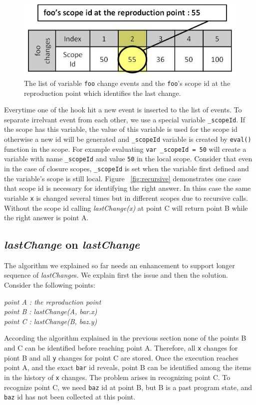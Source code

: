 \documentclass[preprint]{sigplanconf}
\begin{document}
\begin{figure}[htp]
\includegraphics[width=.48\textwidth]{7-foo-changes2.jpg}
\caption{The list of variable \texttt{foo} change events and the \texttt{foo}'s scope id at the reproduction point which identifies the last change.}
\label{fig:foo-changes2}
\end{figure}

Everytime one of the hook hit a new event is inserted to the list of events. To separate irrelvant event from each other, we use a special variable \texttt{\_scopeId}. If the scope has this variable, the value of this variable is used for the scope id otherwise a new id will be generated and \texttt{\_scopeId} variable is created by \texttt{eval()} function in the scope. For example evaluating \texttt{var \_scopeId = 50} will create a variable with name \texttt{\_scopeId} and value \texttt{50} in the local scope. Consider that even in the case of closure scopes, \texttt{\_scopeId} is set when the variable first defined and the variable's scope is still local. Figure ~\ref{fig:recursive} demonstrates one case that scope id is necessary for identifying the right answer. In thiss case the same variable \texttt{x} is changed several times but in different scopes due to recursive calls. Without the scope id calling \textit{lastChange(x)} at point C will return point B while the right answer is point A.
 
\subsection{\textit{lastChange} on \textit{lastChange}}
The algorithm we explained so far needs an enhancement to support longer sequence of \textit{lastChange}s. We explain first the issue and then the solution. Consider the following points:

\begin{center}
\textit{
 point A : the reproduction point \\
 point B : lastChange(A, bar.x) \\
 point C : lastChange(B, baz.y) 
 }
 \end{center}
According the algorithm explained in the previous section none of the points B and C can be identified before reaching point A. Therefore, all \texttt{x} changes for piont B and all \texttt{y} changes for point C are stored. Once the execution reaches point A, and the exact \texttt{bar} id reveals, point B can be identified among the items in the history of \texttt{x} changes. The problem arises in recognizing point C. To recognize point C, we need \texttt{baz} id at point B, but B is a past program state, and \texttt{baz} id has not been collected at this point. 
\end{document}
